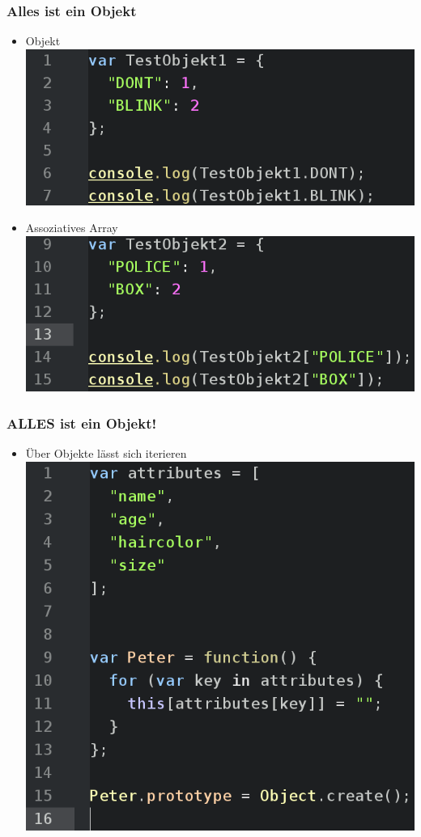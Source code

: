 \documentclass{beamer}
\begin{document}
\begin{frame}
\frametitle{Alles ist ein Objekt}
\begin{itemize}
\item Objekt
\\
\includegraphics[scale=0.3]{assets/everyobject_object.png}
\item Assoziatives Array
\includegraphics[scale=0.3]{assets/everyobject_asarray.png}
\end{itemize}
\end{frame}


\begin{frame}
\frametitle{ALLES ist ein Objekt!}
\begin{itemize}
\item Über Objekte lässt sich iterieren
\\
\includegraphics[scale=0.3]{assets/everyobject_iterating.png}
\end{itemize}
\end{frame}
\end{document}
